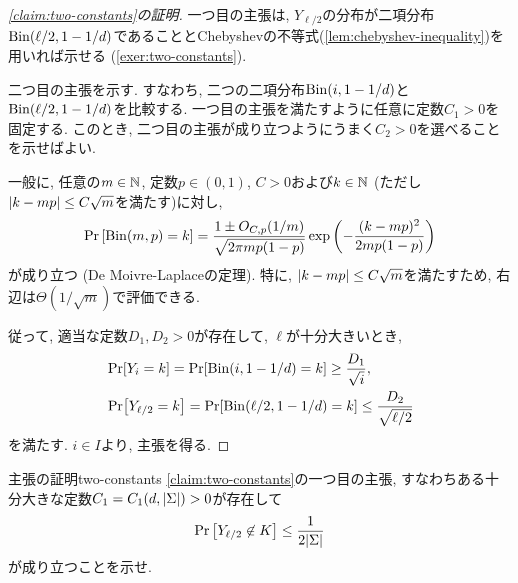 \begin{proof}[\cref{claim:two-constants}の証明]
  一つ目の主張は, $Y_{\ell/2}$の分布が二項分布$\mathrm{Bin}(\ell/2,1-1/d)$であることとChebyshevの不等式(\cref{lem:chebyshev-inequality})を用いれば示せる (\cref{exer:two-constants}).

  二つ目の主張を示す. すなわち, 二つの二項分布$\mathrm{Bin}(i,1-1/d)$と$\mathrm{Bin}(\ell/2,1-1/d)$を比較する.
  一つ目の主張を満たすように任意に定数$C_1>0$を固定する.
  このとき, 二つ目の主張が成り立つようにうまく$C_2>0$を選べることを示せばよい.

  一般に, 任意の$m\in\mathbb{N}$, 定数$p\in(0,1)$, $C>0$および$k\in\mathbb{N}$ (ただし$\abs{k-mp}\le C\sqrt{m}$を満たす)に対し, 
  \begin{align}
    \Pr\qty[\mathrm{Bin}(m,p) = k] = \frac{1 \pm O_{C,p}(1/m)}{\sqrt{2\pi m p(1-p)}} \exp\qty( - \frac{(k-mp)^2}{2m p(1-p)} ) \label{eq:de-moivre-laplace}
  \end{align}
  が成り立つ (De Moivre-Laplaceの定理).
  特に, $\abs{k-mp}\le C\sqrt{m}$を満たすため, 右辺は$\Theta(1/\sqrt{m})$で評価できる.
  
  従って, 適当な定数$D_1,D_2>0$が存在して, $\ell$が十分大きいとき,
  \begin{align*}
    &\Pr[Y_i=k]=\Pr[\mathrm{Bin}(i,1-1/d)=k] \ge \frac{D_1}{\sqrt{i}}, \\
    &\Pr[Y_{\ell/2}=k]=\Pr[\mathrm{Bin}(\ell/2,1-1/d)=k] \le \frac{D_2}{\sqrt{\ell/2}}
  \end{align*}
  を満たす. $i\in I$より, 主張を得る.    
\end{proof}

\begin{exercise}{主張の証明}{two-constants}
  \cref{claim:two-constants}の一つ目の主張, すなわちある十分大きな定数$C_1=C_1(d,\abs{\Sigma})>0$が存在して
  \begin{align*}
    \Pr\qty[Y_{\ell/2} \not\in K] \le \frac{1}{2\abs{\Sigma}}
  \end{align*}
  が成り立つことを示せ.
\end{exercise}

